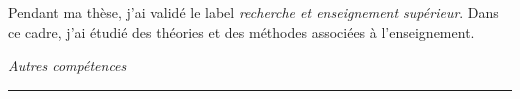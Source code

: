 \documentclass[a4paper,10pt, french]{article}
\begin{document}
%
\vspace{3mm}
Pendant ma thèse, j'ai validé le label \emph{recherche et enseignement supérieur}. Dans ce cadre, j'ai étudié des théories et des méthodes associées à l'enseignement.



\vspace{5mm}

\noindent
\textit{\Large \color{MyGray} \hspace{5mm} Autres compétences}
\vspace{2mm}
{\color{DefaultGray}\hrule height .1pt}
\vspace{5mm}
\end{document}
